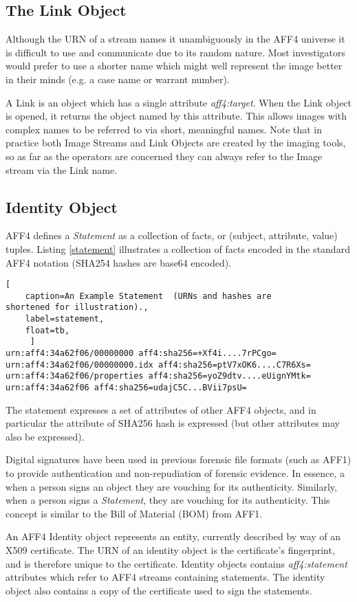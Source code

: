\documentclass[10pt, conference]{IEEEtran}
\begin{document}
{{\subsection{The Link Object}
Although the URN of a stream names it unambiguously in the AFF4
universe it is difficult to use and communicate due to its random
nature. Most investigators would prefer to use a shorter name which
might well represent the image better in their minds (e.g. a case
name or warrant number).

A Link is an object which has a single attribute
\emph{aff4:target}. When the Link object is opened, it returns the
object named by this attribute. This allows images with complex names
to be referred to via short, meaningful names. Note that in practice
both Image Streams and Link Objects are created by the imaging tools,
so as far as the operators are concerned they can always refer to the
Image stream via the Link name.

\subsection{Identity Object}
AFF4 defines a \emph{Statement} as a collection of facts, or
(subject, attribute, value) tuples. Listing \ref{statement}
illustrates a collection of facts encoded in the standard AFF4
notation (SHA254 hashes are base64 encoded).

\begin{lstlisting}[
	caption=An Example Statement  (URNs and hashes are
shortened for illustration).,
	label=statement,
	float=tb,
	 ]
urn:aff4:34a62f06/00000000 aff4:sha256=+Xf4i....7rPCgo=
urn:aff4:34a62f06/00000000.idx aff4:sha256=ptV7xOK6....C7R6Xs=
urn:aff4:34a62f06/properties aff4:sha256=yoZ9dtv....eUignYMtk=
urn:aff4:34a62f06 aff4:sha256=udajC5C...BVii7psU=
\end{lstlisting}

The statement expresses a set of attributes of other AFF4 objects, and
in particular the attribute of SHA256 hash is expressed (but other
attributes may also be expressed).

Digital signatures have been used in previous forensic file formats
(such as AFF1) to provide authentication and non-repudiation of
forensic evidence. In essence, a when a person signs an object they
are vouching for its authenticity. Similarly, when a person signs a
\emph{Statement}, they are vouching for its authenticity. This concept
is similar to the Bill of Material (BOM) from AFF1.

An AFF4 Identity object represents an entity, currently described by
way of an X509 certificate. The URN of an identity object is the
certificate's fingerprint, and is therefore unique to the
certificate. Identity objects contains \emph{aff4:statement}
attributes which refer to AFF4 streams containing statements. The
identity object also contains a copy of the certificate used to sign
the statements.

}}
\end{document}
